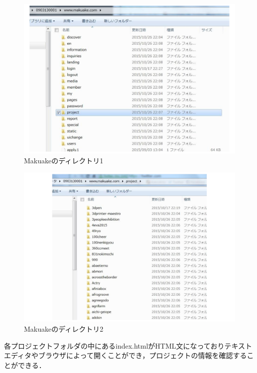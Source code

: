 \begin{figure}[H]
\centering
\includegraphics[width=13cm]{figure35.pdf}
\caption{Makuakeのディレクトリ1}\label{sannp}
\end{figure}

\begin{figure}[H]
\centering
\includegraphics[width=13cm]{figure36.pdf}
\caption{Makuakeのディレクトリ2}\label{sannp}
\end{figure}

各プロジェクトフォルダの中にあるindex.htmlがHTML文になっておりテキストエディタやブラウザによって開くことができ，プロジェクトの情報を確認することができる．

